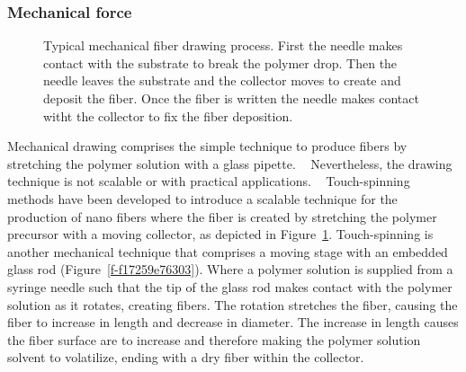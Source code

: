 \subsubsection{Mechanical force}
\bgroup
\begin{figure}[!htbp]
\centering \makeatletter{}
\makeatother 
\caption{{Typical mechanical fiber drawing process. First the needle makes contact with the substrate to break the polymer drop. Then the needle leaves the substrate and the collector moves to create and deposit the fiber. Once the fiber is written the needle makes contact witht the collector to fix the fiber deposition.}}
\label{f-432d16f420fb}
\end{figure}
\egroup
Mechanical drawing comprises the simple technique to produce fibers by stretching the polymer solution with a glass pipette. \unskip~\cite{527120:14024998} Nevertheless, the drawing technique is not scalable or with practical applications. \unskip~\cite{527120:14025041} Touch-spinning methods have been developed to introduce a scalable technique for the production of nano fibers where the fiber is created by stretching the polymer precursor with a moving collector, as depicted in Figure~\ref{f-432d16f420fb}. Touch-spinning is another mechanical technique that comprises a moving stage with an embedded glass rod (Figure~\ref{f-f17259e76303}). Where a polymer solution is supplied from a syringe needle such that the tip of the glass rod makes contact with the polymer solution as it rotates, creating fibers. The rotation stretches the fiber, causing the fiber to increase in length and decrease in diameter. The increase in length causes the fiber surface are to increase and therefore making the polymer solution solvent to volatilize, ending with a dry fiber within the collector.


